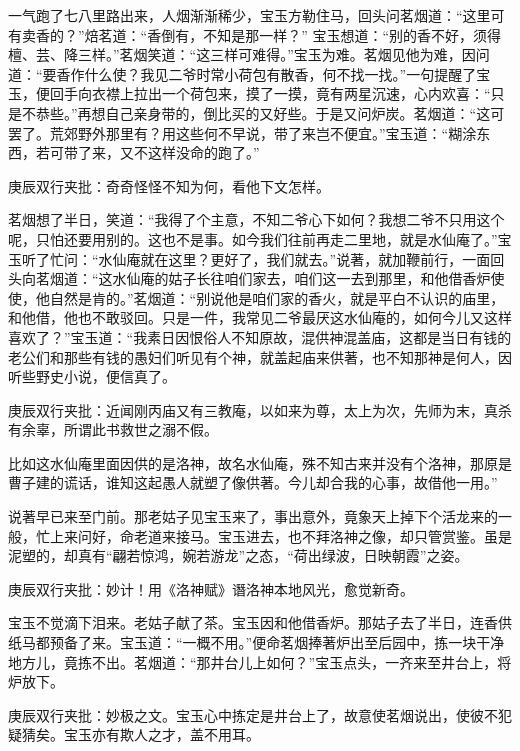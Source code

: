 \begin{parag}


    一气跑了七八里路出来，人烟渐渐稀少，宝玉方勒住马，回头问茗烟道：“这里可有卖香的？”焙茗道：“香倒有，不知是那一样？” 宝玉想道：“别的香不好，须得檀、芸、降三样。”茗烟笑道：“这三样可难得。”宝玉为难。茗烟见他为难，因问道：“要香作什么使？我见二爷时常小荷包有散香，何不找一找。”一句提醒了宝玉，便回手向衣襟上拉出一个荷包来，摸了一摸，竟有两星沉速，心内欢喜：“只是不恭些。”再想自己亲身带的，倒比买的又好些。于是又问炉炭。茗烟道：“这可罢了。荒郊野外那里有？用这些何不早说，带了来岂不便宜。”宝玉道：“糊涂东西，若可带了来，又不这样没命的跑了。”\begin{note}庚辰双行夹批：奇奇怪怪不知为何，看他下文怎样。\end{note}茗烟想了半日，笑道：“我得了个主意，不知二爷心下如何？我想二爷不只用这个呢，只怕还要用别的。这也不是事。如今我们往前再走二里地，就是水仙庵了。”宝玉听了忙问：“水仙庵就在这里？更好了，我们就去。”说著，就加鞭前行，一面回头向茗烟道：“这水仙庵的姑子长往咱们家去，咱们这一去到那里，和他借香炉使使，他自然是肯的。”茗烟道：“别说他是咱们家的香火，就是平白不认识的庙里，和他借，他也不敢驳回。只是一件，我常见二爷最厌这水仙庵的，如何今儿又这样喜欢了？”宝玉道：“我素日因恨俗人不知原故，混供神混盖庙，这都是当日有钱的老公们和那些有钱的愚妇们听见有个神，就盖起庙来供著，也不知那神是何人，因听些野史小说，便信真了。\begin{note}庚辰双行夹批：近闻刚丙庙又有三教庵，以如来为尊，太上为次，先师为末，真杀有余辜，所谓此书救世之溺不假。\end{note}比如这水仙庵里面因供的是洛神，故名水仙庵，殊不知古来并没有个洛神，那原是曹子建的谎话，谁知这起愚人就塑了像供著。今儿却合我的心事，故借他一用。”
\end{parag}


\begin{parag}


    说著早已来至门前。那老姑子见宝玉来了，事出意外，竟象天上掉下个活龙来的一般，忙上来问好，命老道来接马。宝玉进去，也不拜洛神之像，却只管赏鉴。虽是泥塑的，却真有“翩若惊鸿，婉若游龙”之态，“荷出绿波，日映朝霞”之姿。\begin{note}庚辰双行夹批：妙计！用《洛神赋》谮洛神本地风光，愈觉新奇。\end{note}宝玉不觉滴下泪来。老姑子献了茶。宝玉因和他借香炉。那姑子去了半日，连香供纸马都预备了来。宝玉道：“一概不用。”便命茗烟捧著炉出至后园中，拣一块干净地方儿，竟拣不出。茗烟道：“那井台儿上如何？”宝玉点头，一齐来至井台上，将炉放下。\begin{note}庚辰双行夹批：妙极之文。宝玉心中拣定是井台上了，故意使茗烟说出，使彼不犯疑猜矣。宝玉亦有欺人之才，盖不用耳。\end{note}
\end{parag}


